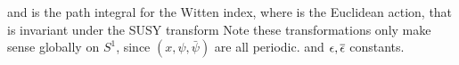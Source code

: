 \documentclass{article}
\begin{document}
and 
is the path integral for the Witten index, where 
is the Euclidean action, that is invariant under the SUSY transform 
Note these transformations only make sense globally on $S^1$, since $(x,\psi,\bar{\psi})$ are all periodic. and $\epsilon,\overline{\epsilon}$ constants. \\
\end{document}

